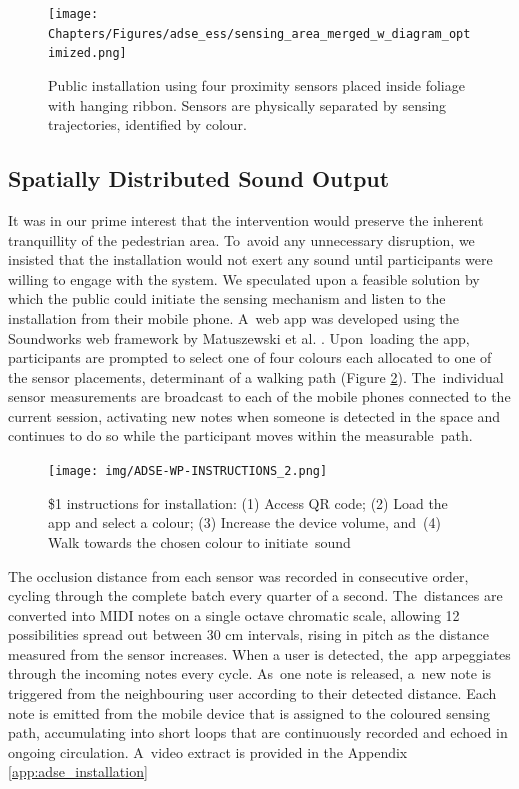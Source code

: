 \begin{figure}[H]
\texttt{[image: Chapters/Figures/adse\_ess/sensing\_area\_merged\_w\_diagram\_optimized.png]}
{\caption{Public installation using four proximity sensors placed inside foliage with hanging ribbon. Sensors are physically separated by sensing trajectories, identified by colour.}
\label{fig:installation_sensor_setup}
}
\end{figure}

\subsection*{Spatially Distributed Sound Output}

It was in our prime interest that the intervention would preserve the inherent tranquillity of the pedestrian area. To~avoid any unnecessary disruption, we insisted that the installation would not exert any sound until participants were willing to engage with the system. We speculated upon a feasible solution by which the public could initiate the sensing mechanism and listen to the installation from their mobile phone. A~web app was developed using the
Soundworks web framework by  Matuszewski et al. %
\cite{matuszewski_interaction_2019}. Upon~loading the app, participants are prompted to select one of four colours each allocated to one of the sensor placements, determinant of a walking path (Figure \ref{fig:installation_instructions}). The~individual sensor measurements are broadcast to each of the mobile phones connected to the current session, activating new notes when someone is detected in the space and continues to do so while the participant moves within the measurable~path.

\vspace{-6pt}
\begin{figure}[H]
\texttt{[image: img/ADSE-WP-INSTRUCTIONS\_2.png]}
{\caption{\$1 %
 instructions for installation: (1) Access QR code; (2) Load the app and select a colour; (3) Increase the device volume, and~(4) Walk towards the chosen colour to initiate~sound}
\label{fig:installation_instructions}}
\end{figure}

The occlusion distance from each sensor was recorded in consecutive order, cycling through the complete batch every quarter of a second. The~distances are converted into MIDI notes on a single octave chromatic scale, allowing 12 possibilities spread out between 30 cm intervals, rising in pitch as the distance measured from the sensor increases. When a user is detected, the~app arpeggiates through the incoming notes every cycle. As~one note is released, a~new note is triggered from the neighbouring user according to their detected distance. Each note is emitted from the mobile device that is assigned to the coloured sensing path, accumulating into short loops that are continuously recorded and echoed in ongoing circulation. A~video extract is provided in the Appendix \ref{app:adse_installation}

